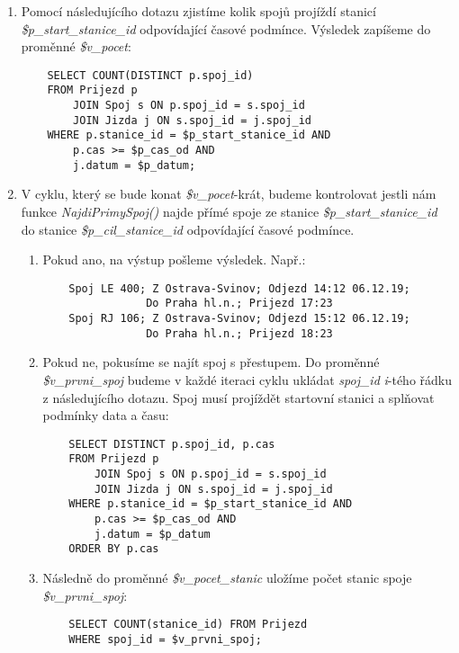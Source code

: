 \documentclass[11pt]{article}
\begin{document}
\begin{enumerate}
    \item Pomocí následujícího dotazu zjistíme kolik spojů projíždí stanicí \textit{\$p\_start\_stanice\_id} odpovídající časové podmínce. Výsledek zapíšeme do proměnné \textit{\$v\_pocet}:
    \begin{lstlisting}
    SELECT COUNT(DISTINCT p.spoj_id)
    FROM Prijezd p
        JOIN Spoj s ON p.spoj_id = s.spoj_id
        JOIN Jizda j ON s.spoj_id = j.spoj_id
    WHERE p.stanice_id = $p_start_stanice_id AND 
        p.cas >= $p_cas_od AND 
        j.datum = $p_datum;
    \end{lstlisting}
    
    \item V cyklu, který se bude konat \textit{\$v\_pocet}-krát, budeme kontrolovat jestli nám funkce \mbox{\textit{NajdiPrimySpoj()}} najde přímé spoje ze stanice \textit{\$p\_start\_stanice\_id} do stanice \textit{\$p\_cil\_stanice\_id} odpovídající časové podmínce.
    
    \begin{enumerate}
        \item Pokud ano, na výstup pošleme výsledek. Např.:
        \begin{lstlisting}
    Spoj LE 400; Z Ostrava-Svinov; Odjezd 14:12 06.12.19;
                Do Praha hl.n.; Prijezd 17:23
    Spoj RJ 106; Z Ostrava-Svinov; Odjezd 15:12 06.12.19;
                Do Praha hl.n.; Prijezd 18:23
        \end{lstlisting}

        \item Pokud ne, pokusíme se najít spoj s přestupem. Do proměnné \textit{\$v\_prvni\_spoj} budeme v každé iteraci cyklu ukládat \textit{spoj\_id} \textit{i}-tého řádku z následujícího dotazu. Spoj musí projíždět startovní stanici a splňovat podmínky data a času:
        \begin{lstlisting}
    SELECT DISTINCT p.spoj_id, p.cas
    FROM Prijezd p
        JOIN Spoj s ON p.spoj_id = s.spoj_id
        JOIN Jizda j ON s.spoj_id = j.spoj_id
    WHERE p.stanice_id = $p_start_stanice_id AND
        p.cas >= $p_cas_od AND 
        j.datum = $p_datum
    ORDER BY p.cas
        \end{lstlisting}

        \item Následně do proměnné \textit{\$v\_pocet\_stanic} uložíme počet stanic spoje \textit{\$v\_prvni\_spoj}:
        \begin{lstlisting}
    SELECT COUNT(stanice_id) FROM Prijezd
    WHERE spoj_id = $v_prvni_spoj;
        \end{lstlisting}


\end{enumerate}
\end{enumerate}
\end{document}
